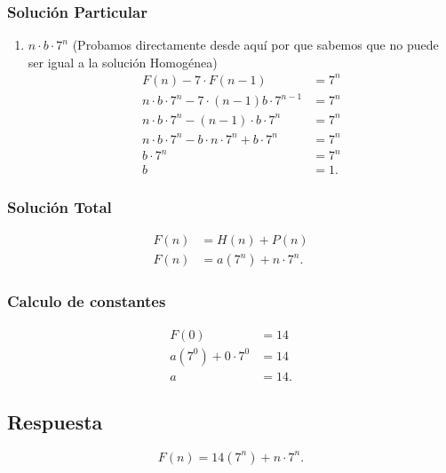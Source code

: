     \subsubsection*{Solución Particular}
    \begin{enumerate}
      \item $n\cdot b\cdot 7^{n}$ (Probamos directamente desde aquí por que sabemos que no puede ser igual a la solución Homogénea)
	\begin{align*}
	  F\left( n \right) - 7\cdot F\left( n - 1 \right) &= 7^{n}\\
	  n\cdot b\cdot 7^{n} - 7\cdot \left( n - 1 \right) b \cdot 7^{n - 1} &= 7^{n} \\
	  n\cdot b \cdot 7^{n} - \left( n - 1 \right) \cdot b \cdot 7^{n}&= 7^{n} \\
	  n\cdot b \cdot 7^{n} - b\cdot n\cdot 7^{n} + b \cdot 7^{n} &= 7^{n} \\
	  b\cdot 7^{n} &= 7^{n} \\
	  b &= 1
	.\end{align*}
    \end{enumerate}

    \subsubsection*{Solución Total}
    \begin{align*}
      F\left( n \right) &= H\left( n \right) + P\left( n \right)  \\
      F\left( n \right)  &= a\left( 7^{n} \right) + n\cdot 7^{n}
    .\end{align*}

    \subsubsection*{Calculo de constantes}
    \begin{align*}
      F\left( 0 \right) &= 14 \\
      a\left( 7^{0} \right) + 0 \cdot 7^{0} &= 14 \\
      a &= 14
    .\end{align*}

    \subsection{Respuesta}
    \[
      F\left( n \right) = 14\left( 7^{n} \right) + n\cdot 7^{n} 
    .\] 


